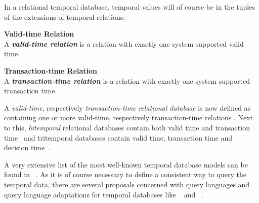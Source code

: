 In a relational temporal database, temporal values will of course be in the tuples of the extensions of temporal relations:

\begin{svgraybox}
\vspace{-10pt}
\begin{definition}\textbf{Valid-time Relation}~\cite{Dyreson1994}\\
A \emph{\textbf{valid-time relation}} is a relation with exactly one system supported valid time.
\end{definition}

\begin{definition}\textbf{Transaction-time Relation}~\cite{Dyreson1994}\\
A \emph{\textbf{transaction-time relation}} is a relation with exactly one system supported transaction time.
\end{definition}
\vspace{-10pt}
\end{svgraybox}

A \emph{valid-time}, respectively \emph{transaction-time} \emph{relational database} is now defined as containing one or more valid-time, respectively transaction-time relations \cite{Dyreson1994}. Next to this, \emph{bitemporal} relational databases contain both valid time and transaction time~\cite{Dyreson1994} and tritemporal databases contain valid time, transaction time and decision time~\cite{Nascimento95decisiontime}.




A very extensive list of the most well-known temporal database models can be found in ~\cite{Yu1998}. As it is of course necessary to define a consistent way to query the temporal data, there are several proposals concerned with query languages and query language adaptations for temporal databases like ~\cite{TSQL} and ~\cite{Snodgrass98}.






